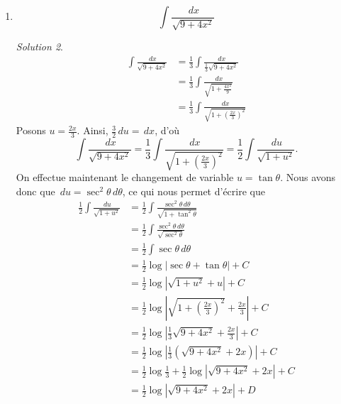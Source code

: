 \documentclass[
  12pt,
  letterpaper,
]{book}
\theoremstyle{remark}
\newtheorem*{solution}{Solution}
\begin{document}
\begin{enumerate}
  \begin{solution}

  On observe que le dénominateur s'annule lorsque \(x=1\). Ainsi,
  \(x-1\) est un de ses facteurs. En divisant \(x^3-x^2+x-1\) par
  \(x-1\), on obtient \(1+x^2\). Il existe donc des constantes \(A,B\)
  et \(C\) telles que
  \[\frac{1}{x^3-x^2+x-1}=\frac{A}{x-1}+\frac{Bx+C}{1+x^2}.\] On trouve
  que \(A=1/2\) et \(B=C=-1/2\). Comme
  \(\int\frac{1/2\,dx}{x-1}=\frac{1}{2}\ln (x-1)+C_1\) et
  \(\int-\frac{1}{2}\frac{(x+1)\,dx}{1+x^2}=-\frac{1}{4}\ln (x^2+1)-\frac{1}{2}\arctan (x)+C_2\),
  il suit que
  \[\int\frac{\,dx}{x^3-x^2+x-1}=\frac{1}{2}\ln (x-1)-\frac{1}{4}\ln (x^2+1)-\frac{1}{2}\arctan (x)+C.\]

  \end{solution}
\item
  \[\int\frac{\,dx}{\sqrt{9+4x^2}}\]

  \begin{solution}

  \begin{align}
  \int\frac{\,dx}{\sqrt{9+4x^2}}&=\frac{1}{3}\int\frac{\,dx}{\frac{1}{3}\sqrt{9+4x^2}} \\
  &=\frac{1}{3}\int\frac{\,dx}{\sqrt{1+\frac{4x^2}{9}}} \\
  &=\frac{1}{3}\int\frac{\,dx}{\sqrt{1+\left(\frac{2x}{3}\right)^2}}
  \end{align} Posons \(u=\frac{2x}{3}\). Ainsi,
  \(\frac{3}{2}\,du=\,dx\), d'où
  \[\int\frac{\,dx}{\sqrt{9+4x^2}}=\frac{1}{3}\int\frac{\,dx}{\sqrt{1+\left(\frac{2x}{3}\right)^2}}=\frac{1}{2}\int\frac{\,du}{\sqrt{1+u^2}}.\]
  On effectue maintenant le changement de variable \(u=\tan\theta\).
  Nous avons donc que \(\,du=\sec^2\theta \,d\theta\), ce qui nous
  permet d'écrire que \begin{align}
  \frac{1}{2}\int\frac{\,du}{\sqrt{1+u^2}}&=\frac{1}{2}\int\frac{\sec^2\theta \,d\theta}{\sqrt{1+\tan^2\theta}} \\
  &=\frac{1}{2}\int\frac{\sec^2\theta \,d\theta}{\sqrt{\sec^2\theta}} \\
  &=\frac{1}{2}\int\sec\theta \,d\theta \\
  &=\frac{1}{2}\log|\sec\theta+\tan\theta|+C \\
  &=\frac{1}{2}\log|\sqrt{1+u^2}+u|+C \\
  &=\frac{1}{2}\log\left|\sqrt{1+\left(\frac{2x}{3}\right)^2}+\frac{2x}{3}\right|+C \\
  &=\frac{1}{2}\log\left|\frac{1}{3}\sqrt{9+4x^2}+\frac{2x}{3}\right|+C \\
  &=\frac{1}{2}\log\left|\frac{1}{3}\left(\sqrt{9+4x^2}+2x\right)\right|+C \\
  &=\frac{1}{2}\log\frac{1}{3}+\frac{1}{2}\log\left|\sqrt{9+4x^2}+2x\right|+C \\
  &=\frac{1}{2}\log\left|\sqrt{9+4x^2}+2x\right|+D
  \end{align}


\end{solution}
\end{enumerate}
\end{document}
